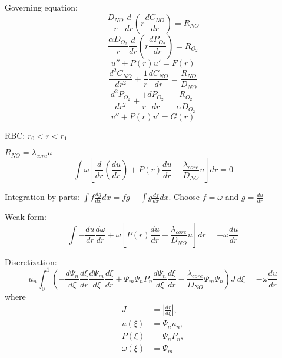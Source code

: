 \documentclass[11pt, a4paper]{article}
\begin{document}
  Governing equation:
  \begin{equation*}
  \frac{D_{NO}}{r}\frac{d}{dr}\left(r\frac{dC_{NO}}{dr}\right)=R_{NO}
  \end{equation*}
  \begin{equation*}
  \frac{\alpha D_{O_2}}{r}\frac{d}{dr}\left(r\frac{dP_{O_2}}{dr}\right)=R_{O_2}
  \end{equation*}
  \begin{equation}
  u''+P(r)u'=F(r)
  \end{equation}
  \begin{equation*}
  \frac{d^2C_{NO}}{dr^2}+\frac{1}{r}\frac{dC_{NO}}{dr}=\frac{R_{NO}}{D_{NO}}
  \end{equation*}
  \begin{equation*}
  \frac{d^2P_{O_2}}{dr^2}+\frac{1}{r}\frac{dP_{O_2}}{dr}=\frac{R_{O_2}}{\alpha 
  D_{O_2}}
  \end{equation*}
  \begin{equation}
  v''+P(r)v'=G(r)
  \end{equation}
    
  RBC: $r_0 < r < r_1$
  
  $R_{NO}=\lambda_{core}u$
  \begin{equation}
  \int \omega 
  \left[\frac{d}{dr}\left(\frac{du}{dr}\right) + P(r)\frac{du}{dr} - 
  \frac{\lambda_{core}}{D_{NO}}u \right]dr = 0
  \end{equation}
  
  Integration by parts: $\int f \frac{dg}{dx} dx = fg - \int g 
  \frac{df}{dx}dx$. Choose $f = \omega$ and $g = \frac{du}{dr}$
  
  Weak form:
  \begin{equation}
  \int -\frac{du}{dr} \frac{d\omega}{dr} + \omega \left[P(r)\frac{du}{dr} - 
  \frac{\lambda_{core}}{D_{NO}}u \right] dr = -\omega\frac{du}{dr}
  \end{equation}
  
  Discretization:
  \begin{equation}
  u_n \int_{0}^{1} \left(-\frac{d\Psi_n}{d\xi} \frac{d\xi}{dr} 
  \frac{d\Psi_m}{d\xi} \frac{d\xi}{dr} + \Psi_m \Psi_n P_n \frac{d\Psi_n}{d\xi} 
  \frac{d\xi}{dr} - \frac{\lambda_{core}}{D_{NO}} \Psi_m\Psi_n\right) J \: d\xi 
  = -\omega \frac{du}{dr}
  \end{equation}
  where
  \begin{align*}
  J &= \left|\frac{dr}{d\xi}\right|,\\
  u(\xi) &= \Psi_n u_n,\\
  P(\xi) &= \Psi_n P_n,\\
  \omega(\xi) &= \Psi_m
  \end{align*}
  
\end{document}
